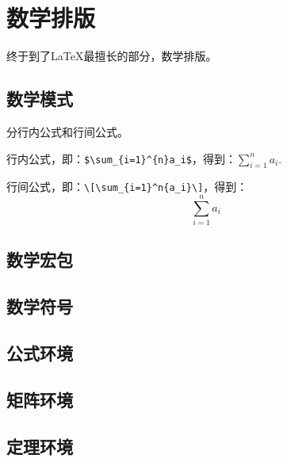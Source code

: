 {\let\clearpage\relax \chapter{数学排版}}

终于到了\LaTeX 最擅长的部分，数学排版。

\section{数学模式}
分行内公式和行间公式。

行内公式，即：\verb|$\sum_{i=1}^{n}a_i$|，得到：$\sum_{i=1}^{n}a_i$.

行间公式，即：\verb|\[\sum_{i=1}^n{a_i}\]|，得到：
\[\sum_{i=1}^{n}a_i\]

\section{数学宏包}

\section{数学符号}

\section{公式环境}

\section{矩阵环境}

\section{定理环境}